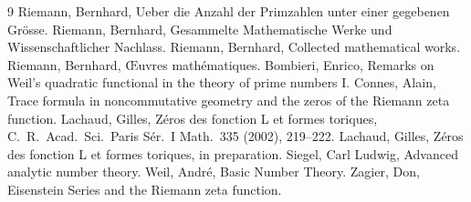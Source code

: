 \documentclass[12pt]{article}
\begin{document}
\begin{thebibliography}{9}
 Riemann, Bernhard, Ueber die Anzahl der Primzahlen unter einer gegebenen Grösse.
 Riemann, Bernhard, Gesammelte Mathematische Werke und Wissenschaftlicher Nachlass.
 Riemann, Bernhard, Collected mathematical works.
 Riemann, Bernhard, Œuvres mathématiques.
 Bombieri, Enrico, Remarks on Weil's quadratic functional in the theory of prime numbers I.
 Connes, Alain, Trace formula in noncommutative geometry and the zeros of the Riemann zeta function.
 Lachaud, Gilles, Zéros des fonction L et formes toriques, C.\ R.\ Acad.\ Sci.\ Paris Sér.\ I Math.\ 335 (2002), 219--222.
 Lachaud, Gilles, Zéros des fonction L et formes toriques, in preparation.
 Siegel, Carl Ludwig, Advanced analytic number theory.
 Weil, André, Basic Number Theory.
 Zagier, Don, Eisenstein Series and the Riemann zeta function.
\end{thebibliography}
\end{document}
